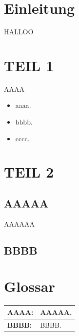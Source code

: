 \documentclass[
    12pt, 
    a4paper,
    ]{scrartcl} %
\begin{document}
\newpage
{} %
\setcounter{page}{1}
\section{Einleitung}
HALLOO

\section{TEIL 1 }
AAAA

\begin{itemize}
    \setlength\itemsep{0.4\baselineskip}
    \setlength\parskip{0pt}
    \setlength\parsep{0pt}
    
    \item \normalsize aaaa.
    \item \normalsize bbbb.
    \item \normalsize cccc.
  \end{itemize}

\section{TEIL 2}
\subsection{AAAAA}
AAAAAA
\subsection{BBBB}

\section*{Glossar}  
\vspace{0.6cm}
\begin{tabular}{p{4cm} p{11.35cm}}   
    \hline
    \textbf{\normalsize AAAA:} & \normalsize AAAAA.\footnotemark[70]\\[0.5cm]
    \hline
    \textbf{\normalsize BBBB:} & \normalsize BBBB. \footnotemark[71]\\[0.5cm]
\end{tabular}

\end{document}

